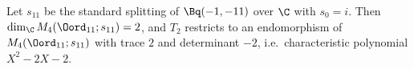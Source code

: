Let $s_{11}$ be the standard splitting of $\Bq(-1,-11)$ over $\C$ with $s_0=i$. Then $\dim_\C M_4(\Oord_{11};s_{11})=2$, and $T_2$ restricts
to an endomorphism of $M_4(\Oord_{11};s_{11})$ with trace $2$ and determinant $-2$, i.e.\ characteristic polynomial $X^2-2X-2$.

